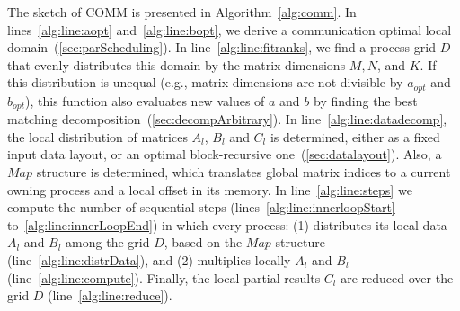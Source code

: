 \documentclass[sigplan,review,anonymous]{acmart}\settopmatter{printfolios=true,printccs=false,printacmref=false}
\begin{document}
The sketch of COMM is presented in
Algorithm~\ref{alg:comm}. In lines~\ref{alg:line:aopt} and~\ref{alg:line:bopt}, 
we derive a communication optimal local domain~(\cref{sec:parScheduling}). In 
line~\ref{alg:line:fitranks}, we find a 
process grid $D$ that evenly distributes this domain by the matrix dimensions 
$M,N$, 
and $K$. If this distribution is unequal (e.g., matrix dimensions are not 
divisible by $a_{opt}$ and $b_{opt}$), this function also evaluates new values 
of 
$a$ and $b$ by finding the best matching 
decomposition~(\cref{sec:decompArbitrary}).
 In line~\ref{alg:line:datadecomp}, 
the local distribution of matrices $A_l$, $B_l$ and $C_l$ is determined, either 
as a fixed input data layout, or an optimal block-recursive 
one~(\cref{sec:datalayout}). Also, a $Map$ structure is determined, which 
translates global matrix indices to a current owning process and a local offset 
in its memory.
 In line~\ref{alg:line:steps} we 
compute the number of sequential steps (lines~\ref{alg:line:innerloopStart} 
to~\ref{alg:line:innerLoopEnd}) in which every process: (1) distributes its 
local 
data $A_l$ and $B_l$  among the grid $D$, based on the $Map$ structure 
(line~\ref{alg:line:distrData}), and (2) multiplies locally $A_l$ and $B_l$ 
(line~\ref{alg:line:compute}). Finally, the local partial results $C_l$ are 
reduced over the grid $D$ (line~\ref{alg:line:reduce}).
\end{document}
